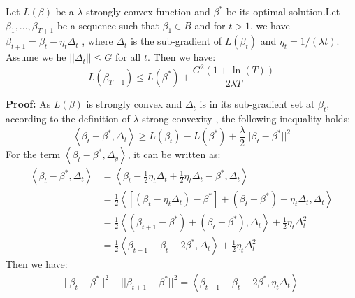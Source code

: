 \begin{theorem}\label{th:1}
Let $L(\beta)$ be a $\lambda$-strongly convex function and $\beta^*$ be its optimal solution.Let $\beta_1,...,\beta_{T+1}$ be a sequence such that $\beta_1 \in B$ and for $t>1$, we have $\beta_{t+1} = \beta_t - \eta_t \Delta_t$ , where $\Delta_t$ is the sub-gradient of $L(\beta_t)$ and $\eta_t = 1/(\lambda t)$. Assume we he $||\Delta_t|| \leq G$ for all $t$. Then we have:	
	\begin{equation}
	L(\beta_{T+1}) \leq L(\beta^*)+\frac{G^2(1+\ln (T))}{2\lambda T}
	\end{equation}
\end{theorem}
\textbf{Proof:}
	As $L(\beta)$ is strongly convex and $\Delta_t$ is in its sub-gradient set at $\beta_t$, according to the definition of $\lambda$-strong convexity \cite{rockafellar2015convex}, the following inequality holds:	
	\begin{equation}\label{eq:app:strong}
		\left\langle {\beta_t - \beta^*,\Delta_t} \right\rangle \geq L(\beta_t)-L(\beta^*)+\frac{\lambda}{2}||\beta_t - \beta^*||^2
	\end{equation} 
	For the term $\left\langle {\beta_t - \beta^*,\Delta_y} \right\rangle$, it can be written as:	
	\begin{equation} \label{eq:app:inner}
	\begin{aligned}
	\left\langle {\beta_t - \beta^*,\Delta_t} \right\rangle &= \left\langle {\beta_t - \frac{1}{2}\eta_t\Delta_t + \frac{1}{2}\eta_t\Delta_t- \beta^*,\Delta_t} \right\rangle\\
	&=\frac{1}{2}\left\langle {\left[ {\left( {{\beta _t} - {\eta _t}{\Delta _t}} \right) - {\beta ^*}} \right] + \left( {{\beta _t} - {\beta ^*}} \right) + {\eta _t}{\Delta _t},{\Delta _t}} \right\rangle \\
	&= \frac{1}{2}\left\langle {\left( {{\beta _{t + 1}} - {\beta ^*}} \right) + \left( {{\beta _t} - {\beta ^*}} \right),{\Delta _t}} \right\rangle  + \frac{1}{2}{\eta _t}\Delta _t^2\\
	&=\frac{1}{2}\left\langle {{\beta _{t + 1}} + {\beta _t} - 2{\beta ^*},{\Delta _t}} \right\rangle  + \frac{1}{2}{\eta _t}\Delta _t^2
	\end{aligned}
	\end{equation}	
	Then we have:
	\begin{equation}\label{eq:app:squrediff}
	\begin{aligned}
	||\beta_t-\beta^*||^2-||\beta_{t+1}-\beta^*||^2 
	=\left\langle {{\beta _{t + 1}} + {\beta _t} - 2{\beta ^*},{\eta_t\Delta _t}} \right\rangle
	\end{aligned}
	\end{equation}
